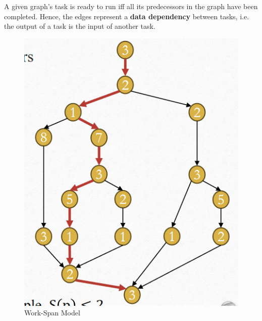 A given graph’s task is ready to run iff all its predecessors in the graph have been completed.
Hence, the edges represent a \textbf{data dependency} between tasks, i.e. the output of a task is the input of another task.


\begin{paracol}{2}
   \begin{figure}[htbp]
      \centering
      \includegraphics{images/07/ws.png}
      \caption{Work-Span Model}
      \label{fig:07/ws}
   \end{figure}
   

\end{paracol}
